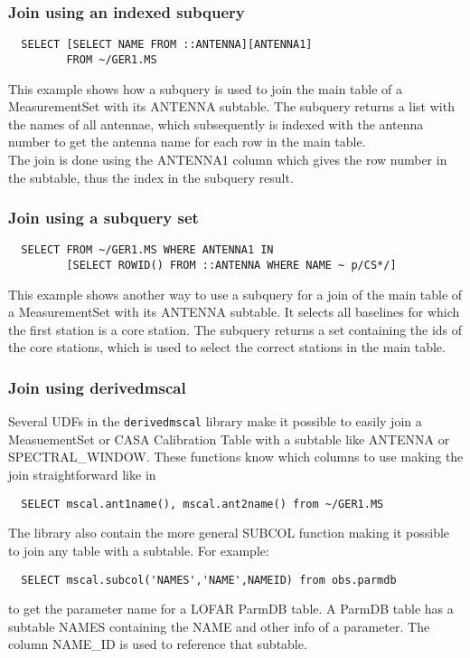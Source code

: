 \subsubsection{Join using an indexed subquery}
\begin{verbatim}
  SELECT [SELECT NAME FROM ::ANTENNA][ANTENNA1]
         FROM ~/GER1.MS 
\end{verbatim}
This example shows how a subquery is used to join the main table of a
MeasurementSet with its ANTENNA subtable. The subquery returns a list
with the names of all antennae, which subsequently is indexed with the
antenna number to get the antenna name for each row in the main table.
\\The join is done using the ANTENNA1 column which gives the row
number in the subtable, thus the index in the subquery result.

\subsubsection{Join using a subquery set}
\begin{verbatim}
  SELECT FROM ~/GER1.MS WHERE ANTENNA1 IN
         [SELECT ROWID() FROM ::ANTENNA WHERE NAME ~ p/CS*/]
\end{verbatim}
This example shows another way to use a subquery for a  join of the
main table of a MeasurementSet with its ANTENNA subtable. 
It selects all baselines for which the first station is a core station.
The subquery returns a set containing the ids of the core stations,
which is used to select the correct stations in the main table.

\subsubsection{Join using derivedmscal}
Several UDFs in the \texttt{derivedmscal} library make it possible to
easily join a MeasuementSet or CASA Calibration Table with a subtable like
ANTENNA or SPECTRAL\_WINDOW. These functions know which columns to use
making the join straightforward like in
\begin{verbatim}
  SELECT mscal.ant1name(), mscal.ant2name() from ~/GER1.MS
\end{verbatim}
The library also contain the more general SUBCOL function making it
possible to join any table with a subtable. For example:
\begin{verbatim}
  SELECT mscal.subcol('NAMES','NAME',NAMEID) from obs.parmdb
\end{verbatim}
to get the parameter name for a LOFAR ParmDB table. A ParmDB table has
a subtable NAMES containing the NAME and other info of a
parameter. The column NAME\_ID is used to reference that subtable.


